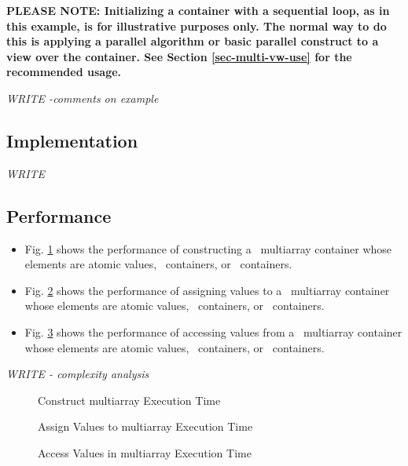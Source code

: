 \textbf{PLEASE NOTE: 
Initializing a container with a sequential loop, as in this example,
is for illustrative purposes only.
The normal way to do this is applying a parallel algorithm or 
basic parallel construct to a view over the container.  See Section
\ref{sec-multi-vw-use}
for the recommended usage.
}

\vspace{0.4cm} \textit{WRITE -comments on example}

\subsection{Implementation} \label{sec-multi-cont-impl}

\textit{WRITE}

\subsection{Performance} \label{sec-multi-cont-perf}

\begin{itemize}
\item
Fig. \ref{fig:multi-cont-constr-exper}
shows the performance of constructing a \stapl\ multiarray container
whose elements are atomic values, \stl\ containers, or \stapl\ containers.
\item
Fig. \ref{fig:multi-cont-assign-exper}
shows the performance of assigning values to a \stapl\ multiarray container
whose elements are atomic values, \stl\ containers, or \stapl\ containers.
\item
Fig. \ref{fig:multi-cont-access-exper}
shows the performance of accessing values from a \stapl\ multiarray container
whose elements are atomic values, \stl\ containers, or \stapl\ containers.
\end{itemize}

\textit{WRITE - complexity analysis}

\begin{figure}[p]
\caption{Construct multiarray Execution Time}
\label{fig:multi-cont-constr-exper}
\end{figure}

\begin{figure}[p]
\caption{Assign Values to multiarray Execution Time}
\label{fig:multi-cont-assign-exper}
\end{figure}

\begin{figure}[p]
\caption{Access Values in multiarray Execution Time}
\label{fig:multi-cont-access-exper}
\end{figure}


